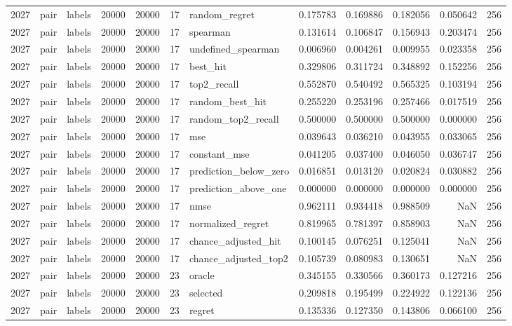 \begin{tabular}{rllrrrlrrrrr}
2027 & pair & labels & 20000 & 20000 & 17 & random_regret & 0.175783 & 0.169886 & 0.182056 & 0.050642 & 256 \\
2027 & pair & labels & 20000 & 20000 & 17 & spearman & 0.131614 & 0.106847 & 0.156943 & 0.203474 & 256 \\
2027 & pair & labels & 20000 & 20000 & 17 & undefined_spearman & 0.006960 & 0.004261 & 0.009955 & 0.023358 & 256 \\
2027 & pair & labels & 20000 & 20000 & 17 & best_hit & 0.329806 & 0.311724 & 0.348892 & 0.152256 & 256 \\
2027 & pair & labels & 20000 & 20000 & 17 & top2_recall & 0.552870 & 0.540492 & 0.565325 & 0.103194 & 256 \\
2027 & pair & labels & 20000 & 20000 & 17 & random_best_hit & 0.255220 & 0.253196 & 0.257466 & 0.017519 & 256 \\
2027 & pair & labels & 20000 & 20000 & 17 & random_top2_recall & 0.500000 & 0.500000 & 0.500000 & 0.000000 & 256 \\
2027 & pair & labels & 20000 & 20000 & 17 & mse & 0.039643 & 0.036210 & 0.043955 & 0.033065 & 256 \\
2027 & pair & labels & 20000 & 20000 & 17 & constant_mse & 0.041205 & 0.037400 & 0.046050 & 0.036747 & 256 \\
2027 & pair & labels & 20000 & 20000 & 17 & prediction_below_zero & 0.016851 & 0.013120 & 0.020824 & 0.030882 & 256 \\
2027 & pair & labels & 20000 & 20000 & 17 & prediction_above_one & 0.000000 & 0.000000 & 0.000000 & 0.000000 & 256 \\
2027 & pair & labels & 20000 & 20000 & 17 & nmse & 0.962111 & 0.934418 & 0.988509 & NaN & 256 \\
2027 & pair & labels & 20000 & 20000 & 17 & normalized_regret & 0.819965 & 0.781397 & 0.858903 & NaN & 256 \\
2027 & pair & labels & 20000 & 20000 & 17 & chance_adjusted_hit & 0.100145 & 0.076251 & 0.125041 & NaN & 256 \\
2027 & pair & labels & 20000 & 20000 & 17 & chance_adjusted_top2 & 0.105739 & 0.080983 & 0.130651 & NaN & 256 \\
2027 & pair & labels & 20000 & 20000 & 23 & oracle & 0.345155 & 0.330566 & 0.360173 & 0.127216 & 256 \\
2027 & pair & labels & 20000 & 20000 & 23 & selected & 0.209818 & 0.195499 & 0.224922 & 0.122136 & 256 \\
2027 & pair & labels & 20000 & 20000 & 23 & regret & 0.135336 & 0.127350 & 0.143806 & 0.066100 & 256 \\

\end{tabular}
